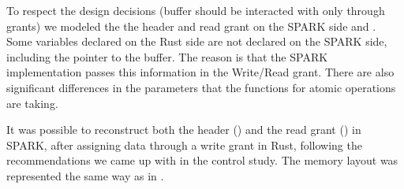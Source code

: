 \documentclass[nomenclature, english, bibtex]{kththesis}
\begin{document}
To respect the design decisions (buffer should be interacted with only through grants) we modeled the the header and read grant on the SPARK side  and . Some variables declared on the Rust side are not declared on the SPARK side, including the pointer to the buffer. The reason is that the SPARK implementation passes this information in the Write/Read grant. There are also significant differences in the parameters that the functions for atomic operations are taking.

It was possible to reconstruct both the header () and the read grant () in SPARK, after assigning data through a write grant in Rust, following the recommendations we came up with in the control study. The memory layout was represented the same way as in .
\end{document}
